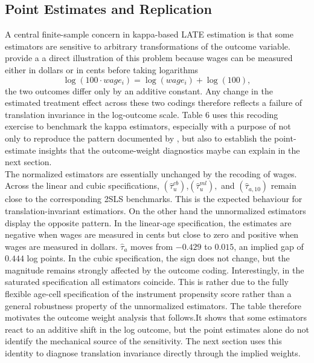 \documentclass[12pt, a4paper, oneside]{article}
\theoremstyle{plain}
\theoremstyle{definition}
\begin{document}
\subsection{Point Estimates and Replication}
\label{subsec:vietnam_estimates}
A central finite-sample concern in kappa-based LATE estimation is that some estimators are sensitive to arbitrary transformations of the outcome variable.
\citet{sloczynski2025abadie}
provide a a direct illustration of this problem because wages can be measured either in dollars or in cents before taking logarithms $$\log(100 \cdot wage_i)=\log(wage_i)+\log(100),$$
the two outcomes differ only by an additive constant. Any change in the estimated treatment effect across these two codings therefore reflects a failure of translation invariance in the log-outcome scale.
Table 6 uses this recoding exercise to benchmark the kappa estimators, especially with a purpose of not only to reproduce the pattern documented by \citet{sloczynski2025abadie}, but also to establish the point-estimate insights that the outcome-weight diagnostics maybe can explain in the next section.\\
The normalized estimators are essentially unchanged by the recoding of wages. Across the linear and cubic specifications, $(\hat\tau_u^{cb})$,$ (\hat\tau_u^{ml}),$ and $(\hat\tau_{a,10})$ remain close to the corresponding 2SLS benchmarks. This is the expected behaviour for translation-invariant estimatiors.
On the other hand the unnormalized estimators display the opposite pattern.
In the linear-age specification, the estimates are negative when wages are
measured in cents but close to zero and positive when wages are measured in
dollars.
$\hat{\tau}_a$ moves from $-0.429$ to $0.015$, an implied gap of
$0.444$ log points.
 In the cubic specification, the sign does not change, but the magnitude remains strongly affected by the outcome coding. Interestingly, in the saturated specification all estimators coincide. 
This is rather due to the fully flexible age-cell specification of the instrument propensity score rather than a general robustness property of the unnormalized estimators.
The table therefore motivates the outcome weight analysis that follows.It shows that some estimators react to an additive shift in the log outcome, but the point estimates alone do not identify the mechanical source of the sensitivity. The next section uses this identity to diagnose translation invariance directly through the implied weights.
\end{document}

